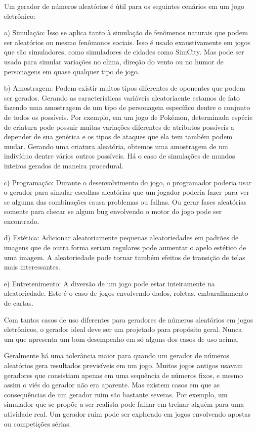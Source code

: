 

Um gerador de números aleatórios é útil para os seguintes cenários em
um jogo eletrônico:

a) Simulação: Isso se aplica tanto à simulação de fenômenos naturais
que podem ser aleatórios ou mesmo fenômonos sociais. Isso é usado
exaustivamente em jogos que são simuladores, como simuladores de
cidades como SimCity. Mas pode ser usado para simular variações no
clima, direção do vento ou no humor de personagens em quase qualquer
tipo de jogo.

b) Amostragem: Podem existir muitos tipos diferentes de oponentes que
podem ser gerados. Gerando as características variáveis aleatoriaente
estamos de fato fazendo uma amostragem de um tipo de personagem
específico dentre o conjunto de todos os possíveis. Por exemplo, em um
jogo de Pokémon, determinada espécie de criatura pode possuir muitas
variações diferentes de atributos possíveis a depender de sua genética
e os tipos de ataques que ela tem também podem mudar. Gerando uma
criatura aleatória, obtemos uma amostragem de um indivíduo dentre
vários outros possíveis. Há o caso de simulações de mundos inteiros
gerados de maneira procedural.

c) Programação: Durante o desenvolvimento do jogo, o programador
poderia usar o gerador para simular escolhas aleatórias que um jogador
poderia fazer para ver se alguma das combinações causa problemas ou
falhas. Ou gerar fases aleatórias somente para checar se algum bug
envolvendo o motor do jogo pode ser encontrado.

d) Estética: Adicionar aleatoriamente pequenas aleatoriedades em
padrões de imagens que de outra forma seriam regulares pode aumentar o
apelo estético de uma imagem. A aleatoriedade pode tornar também
efeitos de transição de telas mais interessantes.

e) Entretenimento: A diversão de um jogo pode estar inteiramente na
aleatoriedade. Este é o caso de jogos envolvendo dados, roletas,
embaralhamento de cartas.

Com tantos casos de uso diferentes para geradores de números
aleatórios em jogos eletrônicos, o gerador ideal deve ser um projetado
para propósito geral. Nunca um que apresenta um bom desempenho em só
alguns dos casos de uso acima.

Geralmente há uma tolerância maior para quando um gerador de números
aleatórios gera resultados previsíveis em um jogo.  Muitos jogos
antigos usavam geradores que consistiam apenas em uma sequência de
números fixos, e mesmo assim o viés do gerador não era aparente. Mas
existem casos em que as consequências de um gerador ruim são bastante
severas. Por exemplo, um simulador que se propõe a ser realista pode
falhar em treinar alguém para uma atividade real. Um gerador ruim pode
ser explorado em jogos envolvendo apostas ou competições sérias.

